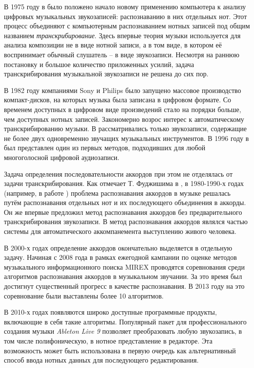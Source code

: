 В 1975 году в \cite{Moorer1975} было положено начало новому применению
компьютера к анализу цифровых музыкальных звукозаписей: распознаванию в них
отдельных нот. Этот процесс объединяют с компьютерным распознаванием нотных
записей под общим названием \emph{транскрибирование}. Здесь впервые теория
музыки используется для анализа композиции не в виде нотной записи, а в том
виде, в котором её воспринимает обычный слушатель -- в виде звукозаписи.
Несмотря на раннюю постановку и большое количество приложенных усилий, задача
транскрибирования музыкальной звукозаписи не решена до сих пор.

В 1982 году компаниями Sony и Philips было запущено массовое производство
компакт-дисков, на которых музыка была записана в цифровом формате. Со временем
доступных в цифровом виде произведений стало на порядки больше, чем доступных
нотных записей. Закономерно возрос интерес к автоматическому транскрибированию
музыки. В \cite{Moorer1975} рассматривались только звукозаписи, содержащие не
более двух одновременно звучащих музыкальных инструментов. В 1996 году в
\cite{Martin1996} был представлен один из первых методов, подходивших для любой
многоголосной цифровой аудиозаписи.

Задача определения последовательности аккордов при этом не отделялась от задачи
транскрибирования. Как отмечает Т. Фуджишима в \cite{Fujishima1999},
в 1980-1990-х годах (например, в работе \cite{Aono1998}) проблема распознавания
аккордов в музыке решалась путём распознавания отдельных нот и их последующего
объединения в аккорды. Он же впервые предложил метод распознавания аккордов без
предварительного транскрибирования звукозаписи. В \cite{Aono1998} метод
распознавания аккордов являлся частью системы для автоматического
аккомпанемента выступлению живого человека.

В 2000-х годах определение аккордов окончательно выделяется в отдельную задачу.
Начиная с 2008 года в рамках ежегодной кампании по оценке методов музыкального
информационного поиска MIREX \cite{MirexHome} проводятся соревнования среди
алгоритмов распознавания аккордов в музыкальном звучании. За это время был
достигнут существенный прогресс в качестве распознавания. В 2013 году на это
соревнование были выставлены более 10 алгоритмов.

В 2010-х годах появляются широко доступные программные продукты, включающие в
себя такие алгоритмы. Популярный пакет для профессионального создания музыки
\emph{Ableton Live 9} \cite{AbletonLive} позволяет преобразовать любую
звукозапись, в том числе полифоническую, в нотное представление в редакторе. Эта
возможность может быть использована в первую очередь как альтернативный способ
ввода нотных данных для последующего редактирования.

